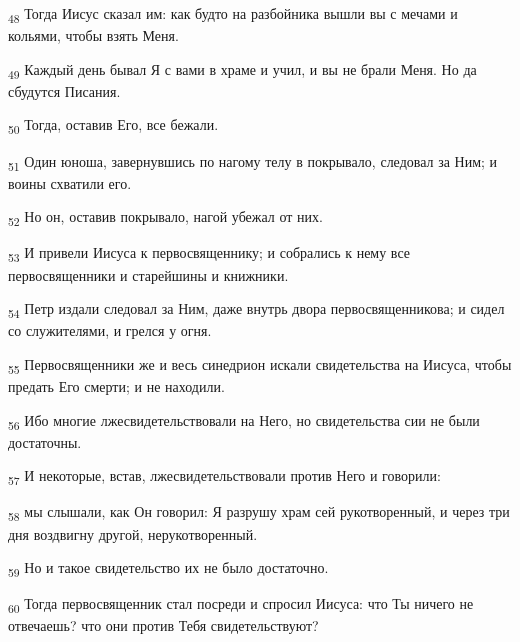 \begin{tcolorbox}
\textsubscript{48} Тогда Иисус сказал им: как будто на разбойника вышли вы с мечами и кольями, чтобы взять Меня.
\end{tcolorbox}
\begin{tcolorbox}
\textsubscript{49} Каждый день бывал Я с вами в храме и учил, и вы не брали Меня. Но да сбудутся Писания.
\end{tcolorbox}
\begin{tcolorbox}
\textsubscript{50} Тогда, оставив Его, все бежали.
\end{tcolorbox}
\begin{tcolorbox}
\textsubscript{51} Один юноша, завернувшись по нагому телу в покрывало, следовал за Ним; и воины схватили его.
\end{tcolorbox}
\begin{tcolorbox}
\textsubscript{52} Но он, оставив покрывало, нагой убежал от них.
\end{tcolorbox}
\begin{tcolorbox}
\textsubscript{53} И привели Иисуса к первосвященнику; и собрались к нему все первосвященники и старейшины и книжники.
\end{tcolorbox}
\begin{tcolorbox}
\textsubscript{54} Петр издали следовал за Ним, даже внутрь двора первосвященникова; и сидел со служителями, и грелся у огня.
\end{tcolorbox}
\begin{tcolorbox}
\textsubscript{55} Первосвященники же и весь синедрион искали свидетельства на Иисуса, чтобы предать Его смерти; и не находили.
\end{tcolorbox}
\begin{tcolorbox}
\textsubscript{56} Ибо многие лжесвидетельствовали на Него, но свидетельства сии не были достаточны.
\end{tcolorbox}
\begin{tcolorbox}
\textsubscript{57} И некоторые, встав, лжесвидетельствовали против Него и говорили:
\end{tcolorbox}
\begin{tcolorbox}
\textsubscript{58} мы слышали, как Он говорил: Я разрушу храм сей рукотворенный, и через три дня воздвигну другой, нерукотворенный.
\end{tcolorbox}
\begin{tcolorbox}
\textsubscript{59} Но и такое свидетельство их не было достаточно.
\end{tcolorbox}
\begin{tcolorbox}
\textsubscript{60} Тогда первосвященник стал посреди и спросил Иисуса: что Ты ничего не отвечаешь? что они против Тебя свидетельствуют?
\end{tcolorbox}
